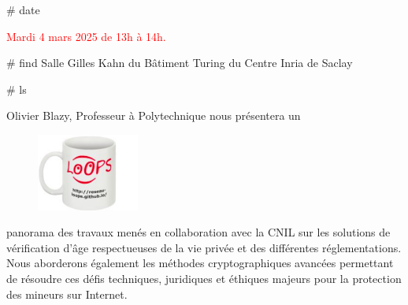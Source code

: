 \documentclass[final]{beamer}
\newlength{\twocolwid}
\begin{document}
\begin{frame}[t]
\begin{columns}[t]
\begin{column}{\twocolwid}
			\vspace{1in}

			\begin{block}{\# date}

				{\textcolor{red}{
				 Mardi 4 mars 2025 de 13h \`{a} 14h.
				}}

			\end{block}


			\begin{block}{\# find}
				 Salle Gilles Kahn du B\^{a}timent Turing du Centre Inria de Saclay
			\end{block}

			\begin{block}{\# ls}


				 Olivier Blazy, Professeur à Polytechnique nous pr\'{e}sentera un

				\begin{figure}
					\centering
					\includegraphics[width=0.3\textwidth]{tasse_b.png}
				\end{figure}

				panorama des travaux men\'{e}s en collaboration avec la CNIL sur les solutions de
				v\'{e}rification d'\^{a}ge respectueuses de la vie priv\'{e}e et des diff\'{e}rentes
				r\'{e}glementations.
				Nous aborderons \'{e}galement les m\'{e}thodes cryptographiques avanc\'{e}es permettant de
				r\'{e}soudre ces d\'{e}fis techniques, juridiques et \'{e}thiques majeurs pour
				la protection des mineurs sur Internet.

				\vspace{-0.5in}

			\end{block}





\end{column}
\end{columns}
\end{frame}
\end{document}
